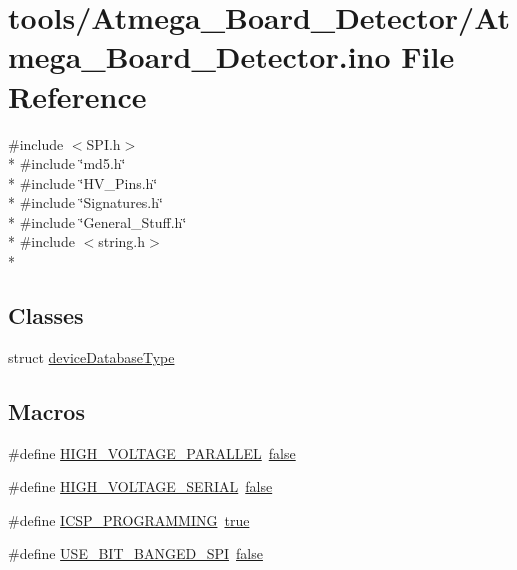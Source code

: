 \hypertarget{Atmega__Board__Detector_8ino}{\section{tools/\-Atmega\-\_\-\-Board\-\_\-\-Detector/\-Atmega\-\_\-\-Board\-\_\-\-Detector.ino File Reference}
\label{Atmega__Board__Detector_8ino}
}
{\ttfamily \#include $<$S\-P\-I.\-h$>$}\\*
{\ttfamily \#include \char`\"{}md5.\-h\char`\"{}}\\*
{\ttfamily \#include \char`\"{}H\-V\-\_\-\-Pins.\-h\char`\"{}}\\*
{\ttfamily \#include \char`\"{}Signatures.\-h\char`\"{}}\\*
{\ttfamily \#include \char`\"{}General\-\_\-\-Stuff.\-h\char`\"{}}\\*
{\ttfamily \#include $<$string.\-h$>$}\\*
\subsection*{Classes}
\begin{DoxyCompactItemize}
\item 
struct \hyperlink{structdeviceDatabaseType}{device\-Database\-Type}
\end{DoxyCompactItemize}
\subsection*{Macros}
\begin{DoxyCompactItemize}
\item 
\#define \hyperlink{Atmega__Board__Detector_8ino_a00903e98b6ab522c9725fea2af17ed7b}{H\-I\-G\-H\-\_\-\-V\-O\-L\-T\-A\-G\-E\-\_\-\-P\-A\-R\-A\-L\-L\-E\-L}~\hyperlink{stdbool_8h_a65e9886d74aaee76545e83dd09011727}{false}
\item 
\#define \hyperlink{Atmega__Board__Detector_8ino_a22d91d65bc68333d9573450ab71960b1}{H\-I\-G\-H\-\_\-\-V\-O\-L\-T\-A\-G\-E\-\_\-\-S\-E\-R\-I\-A\-L}~\hyperlink{stdbool_8h_a65e9886d74aaee76545e83dd09011727}{false}
\item 
\#define \hyperlink{Atmega__Board__Detector_8ino_a3e7ecf511d36afaf581ec50b5f6748d6}{I\-C\-S\-P\-\_\-\-P\-R\-O\-G\-R\-A\-M\-M\-I\-N\-G}~\hyperlink{stdbool_8h_a41f9c5fb8b08eb5dc3edce4dcb37fee7}{true}
\item 
\#define \hyperlink{Atmega__Board__Detector_8ino_a561e6ef25cbccae64b01143c40c9ad69}{U\-S\-E\-\_\-\-B\-I\-T\-\_\-\-B\-A\-N\-G\-E\-D\-\_\-\-S\-P\-I}~\hyperlink{stdbool_8h_a65e9886d74aaee76545e83dd09011727}{false}
\end{DoxyCompactItemize}
